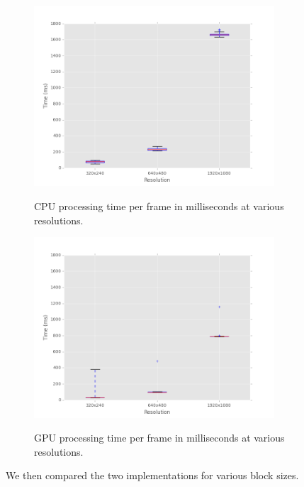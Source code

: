 \documentclass[12pt,letterpaper]{article}
\begin{document}
\begin{figure}[H]
  \centering
    \includegraphics[width=0.8\textwidth]{img/cpu_resolution.png}
  \label{fig:cpures}
  \caption{CPU processing time per frame in milliseconds at various resolutions.}
\end{figure}

\begin{figure}[H]
  \centering
    \includegraphics[width=0.8\textwidth]{img/gpu_resolution.png}
  \label{fig:gpures}
  \caption{GPU processing time per frame in milliseconds at various resolutions.}
\end{figure}

We then compared the two implementations for various block sizes.
\end{document}
